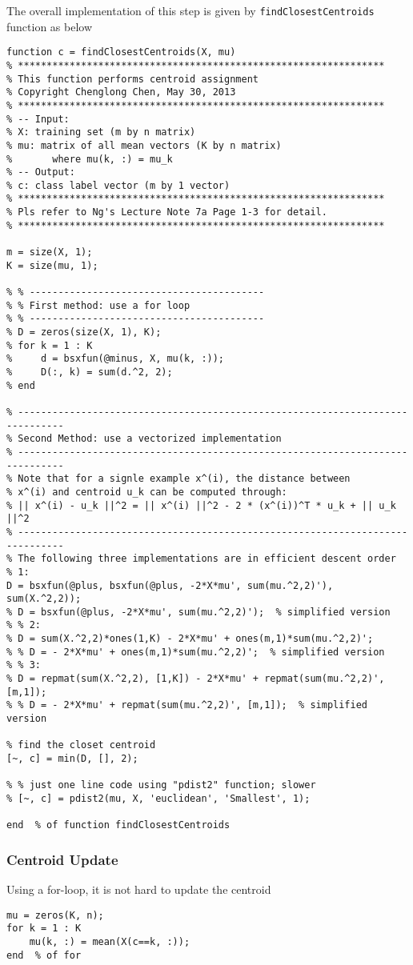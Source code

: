 \documentclass{article}
\begin{document}
The overall implementation of this step is given by \texttt{findClosestCentroids} function as below
\begin{verbatim}
function c = findClosestCentroids(X, mu)
% ****************************************************************
% This function performs centroid assignment
% Copyright Chenglong Chen, May 30, 2013
% ****************************************************************
% -- Input:
% X: training set (m by n matrix)
% mu: matrix of all mean vectors (K by n matrix)
%       where mu(k, :) = mu_k
% -- Output:
% c: class label vector (m by 1 vector)
% ****************************************************************
% Pls refer to Ng's Lecture Note 7a Page 1-3 for detail.
% ****************************************************************

m = size(X, 1);
K = size(mu, 1);

% % -----------------------------------------
% % First method: use a for loop
% % -----------------------------------------
% D = zeros(size(X, 1), K);
% for k = 1 : K
%     d = bsxfun(@minus, X, mu(k, :));
%     D(:, k) = sum(d.^2, 2);
% end

% ------------------------------------------------------------------------------
% Second Method: use a vectorized implementation
% ------------------------------------------------------------------------------
% Note that for a signle example x^(i), the distance between
% x^(i) and centroid u_k can be computed through:
% || x^(i) - u_k ||^2 = || x^(i) ||^2 - 2 * (x^(i))^T * u_k + || u_k ||^2
% ------------------------------------------------------------------------------
% The following three implementations are in efficient descent order
% 1:
D = bsxfun(@plus, bsxfun(@plus, -2*X*mu', sum(mu.^2,2)'), sum(X.^2,2));
% D = bsxfun(@plus, -2*X*mu', sum(mu.^2,2)');  % simplified version
% % 2:
% D = sum(X.^2,2)*ones(1,K) - 2*X*mu' + ones(m,1)*sum(mu.^2,2)';
% % D = - 2*X*mu' + ones(m,1)*sum(mu.^2,2)';  % simplified version
% % 3:
% D = repmat(sum(X.^2,2), [1,K]) - 2*X*mu' + repmat(sum(mu.^2,2)', [m,1]);
% % D = - 2*X*mu' + repmat(sum(mu.^2,2)', [m,1]);  % simplified version

% find the closet centroid
[~, c] = min(D, [], 2);

% % just one line code using "pdist2" function; slower
% [~, c] = pdist2(mu, X, 'euclidean', 'Smallest', 1);

end  % of function findClosestCentroids
\end{verbatim}

\subsubsection{Centroid Update}
Using a for-loop, it is not hard to update the centroid
\begin{verbatim}
mu = zeros(K, n);
for k = 1 : K
    mu(k, :) = mean(X(c==k, :));
end  % of for
\end{verbatim}
\end{document}

